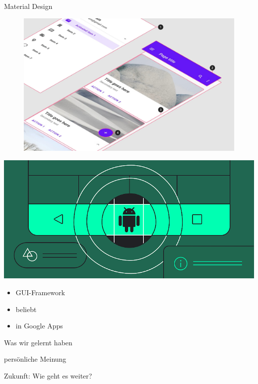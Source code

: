 \documentclass[aspectratio=169]{beamer}
\begin{document}
\begin{frame}{Material Design}
\begin{varwidth}{.5\textwidth}
        \begin{figure}
            \centering
            \includegraphics[width=\textwidth]{media/material-design-in-action.jpg}
        \end{figure}
    \end{varwidth}
    \hfill
    \begin{varwidth}{.4\textwidth}
        \includegraphics[width=\textwidth]{media/material-android.png}
        \begin{itemize}\pause
            \item GUI-Framework\pause
            \item beliebt\pause
            \item in Google Apps
        \end{itemize}
    \end{varwidth} 
\end{frame}

\begin{frame}{Was wir gelernt haben}
\end{frame}

\begin{frame}{persönliche Meinung}
\end{frame}

\begin{frame}{Zukunft: Wie geht es weiter?}
\end{frame}
\end{document}
